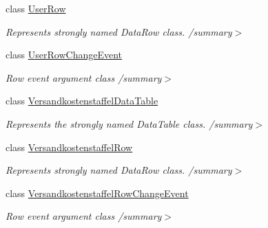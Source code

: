 \begin{DoxyCompactItemize}
class \hyperlink{class_products_1_1_data_1_1ds_sage_1_1_user_row}{User\+Row}
\begin{DoxyCompactList}\small\item\em Represents strongly named Data\+Row class. /summary$>$ \end{DoxyCompactList}\item 
class \hyperlink{class_products_1_1_data_1_1ds_sage_1_1_user_row_change_event}{User\+Row\+Change\+Event}
\begin{DoxyCompactList}\small\item\em Row event argument class /summary$>$ \end{DoxyCompactList}\item 
class \hyperlink{class_products_1_1_data_1_1ds_sage_1_1_versandkostenstaffel_data_table}{Versandkostenstaffel\+Data\+Table}
\begin{DoxyCompactList}\small\item\em Represents the strongly named Data\+Table class. /summary$>$ \end{DoxyCompactList}\item 
class \hyperlink{class_products_1_1_data_1_1ds_sage_1_1_versandkostenstaffel_row}{Versandkostenstaffel\+Row}
\begin{DoxyCompactList}\small\item\em Represents strongly named Data\+Row class. /summary$>$ \end{DoxyCompactList}\item 
class \hyperlink{class_products_1_1_data_1_1ds_sage_1_1_versandkostenstaffel_row_change_event}{Versandkostenstaffel\+Row\+Change\+Event}
\begin{DoxyCompactList}\small\item\em Row event argument class /summary$>$ \end{DoxyCompactList}\end{DoxyCompactItemize}
